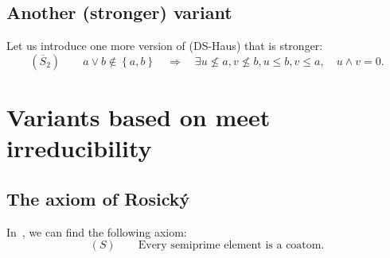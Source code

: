 \subsection{Another (stronger) variant}
Let us introduce one more version of (DS-Haus) that is stronger:
\[
  (\overline{S}_2) \qquad
  a \vee b \not\in \left\{a, b\right\} \quad \Rightarrow \quad \exists
  u\not\leq a, v\not\leq b, \boxed{u \le b, v \le a}, \quad u \wedge v = 0.
\]

\section{Variants based on meet irreducibility}

\subsection{The axiom of Rosický}
In~\cite{rosicky-smarda85}, we can find the following axiom:
\[
  (S) \qquad
  \text{Every semiprime element is a~coatom.}
\]
